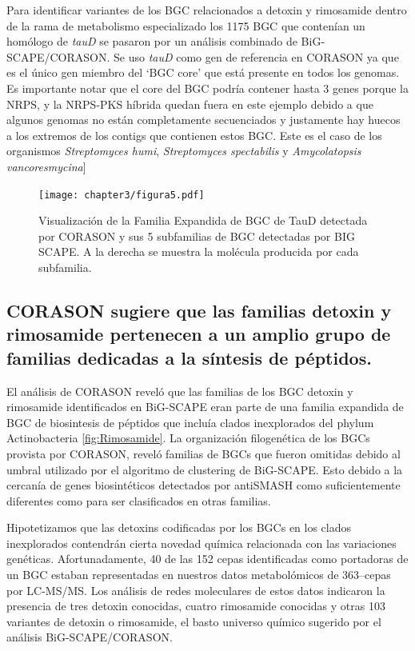 \documentclass[12pt,twoside]{reedthesis}
\begin{document}
  Para identificar variantes de los BGC relacionados a detoxin y
  rimosamide dentro de la rama de metabolismo especializado los 1175 BGC
  que contenían un homólogo de \emph{tauD} se pasaron por un análisis
  combinado de BiG-SCAPE/CORASON. Se uso \emph{tauD} como gen de
  referencia en CORASON ya que es el único gen miembro del `BGC core' que
  está presente en todos los genomas. Es importante notar que el core del
  BGC podría contener hasta 3 genes porque la NRPS, y la NRPS-PKS híbrida
  quedan fuera en este ejemplo debido a que algunos genomas no están
  completamente secuenciados y justamente hay huecos a los extremos de los
  contigs que contienen estos BGC. Este es el caso de los organismos
  \emph{Streptomyces humi}, \emph{Streptomyces spectabilis} y
  \emph{Amycolatopsis vancoresmycina}{]}
  
  \begin{figure}[h!tbp]
  \centering
  \texttt{[image: chapter3/figura5.pdf]}
  \caption[Rimosamide]{\footnotesize{Visualización de la Familia Expandida de BGC de TauD detectada por CORASON y sus 5 subfamilias de BGC detectadas por BIG SCAPE. A la derecha se muestra la molécula producida por cada subfamilia.}}
  \label{fig:Rimosamide}
  \end{figure}
  
  \subsection{CORASON sugiere que las familias detoxin y rimosamide
  pertenecen a un amplio grupo de familias dedicadas a la síntesis de
  péptidos.}\label{corason-sugiere-que-las-familias-detoxin-y-rimosamide-pertenecen-a-un-amplio-grupo-de-familias-dedicadas-a-la-sintesis-de-peptidos.}
  
  El análisis de CORASON reveló que las familias de los BGC detoxin y
  rimosamide identificados en BiG-SCAPE eran parte de una familia
  expandida de BGC de biosintesis de péptidos que incluía clados
  inexplorados del phylum Actinobacteria \autoref{fig:Rimosamide}. La
  organización filogenética de los BGCs provista por CORASON, reveló
  familias de BGCs que fueron omitidas debido al umbral utilizado por el
  algoritmo de clustering de BiG-SCAPE. Esto debido a la cercanía de genes
  biosintéticos detectados por antiSMASH como suficientemente diferentes
  como para ser clasificados en otras familias.
  
  Hipotetizamos que las detoxins codificadas por los BGCs en los clados
  inexplorados contendrán cierta novedad química relacionada con las
  variaciones genéticas. Afortunadamente, 40 de las 152 cepas
  identificadas como portadoras de un BGC estaban representadas en
  nuestros datos metabolómicos de 363--cepas por LC-MS/MS. Los análisis de
  redes moleculares de estos datos indicaron la presencia de tres detoxin
  conocidas, cuatro rimosamide conocidas y otras 103 variantes de detoxin
  o rimosamide, el basto universo químico sugerido por el análisis
  BiG-SCAPE/CORASON.
  
\end{document}

